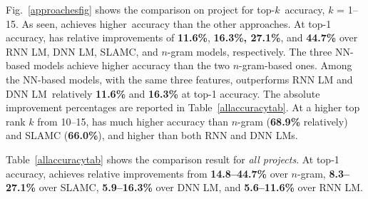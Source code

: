 Fig.~\ref{approachesfig} shows the comparison on 
project for top-$k$~accuracy, $k$ = 1--15.  As seen,
{\tool} achieves higher~accuracy than the other approaches. At top-1
accuracy, {\tool} has relative improvements of {\bf 11.6\%}, {\bf
  16.3\%, 27.1\%}, and {\bf 44.7\%} over RNN LM, DNN LM, SLAMC, and
$n$-gram models, respectively. 
%
%
The three NN-based models achieve higher accuracy than the two
$n$-gram-based ones.
%
%
Among the NN-based models, with the same three features, {\tool}
outperforms RNN LM and DNN LM~relatively {\bf 11.6\%} and {\bf 16.3\%}
at top-1 accuracy. The absolute improvement percentages are reported
in Table~\ref{allaccuracytab}.
At a higher top rank $k$ from 10--15, {\tool} has much higher accuracy
than $n$-gram ({\bf 68.9\%} relatively) and SLAMC ({\bf 66.0\%}), and
higher than both RNN and DNN LMs.



Table~\ref{allaccuracytab} shows the comparison result for {\em all
  projects}. At top-1 accuracy, {\tool} achieves relative improvements
from {\bf 14.8--44.7\%} over $n$-gram, {\bf 8.3--27.1\%} over SLAMC,
{\bf 5.9--16.3\%} over DNN LM, and {\bf 5.6--11.6\%} over RNN LM.

%







